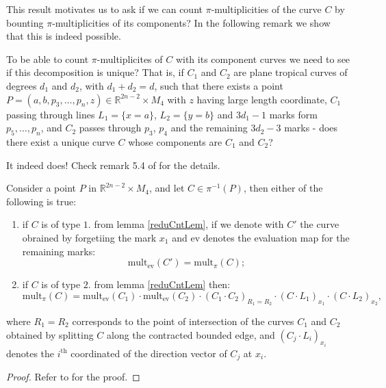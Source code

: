 This result motivates us to ask if we can count $\pi$-multiplicities of the curve $C$ by bounting $\pi$-multiplicities of its components?
In the following remark we show that this is indeed possible.

\begin{remark}
    \label{convReduCnt}
    To be able to count $\pi$-multiplicites of $C$ with its component curves we need to see if this decomposition is unique?
    That is, if $C_{1}$ and $C_{2}$ are plane tropical curves of degrees $d_{1}$ and $d_{2}$, with $d_{1}+d_{2}=d$, such that there exists a point $ P = (a,b, p_{3}, \dots, p_{n}, z) \in \mathbb{R}^{2n-2} \times M_{4}$ 
    with $z$ having large length coordinate, $C_{1}$ passing through lines $L_{1} = \{x = a\}$, $L_{2} = \{y = b\}$ and $3d_{1}-1$  marks form $p_{5},\dots, p_{n}$, and $C_{2}$ passes through $p_{3}$, $p_{4}$ and the remaining $3d_{2}-3$ marks - does there exist a unique curve $C$ whose components are $C_{1}$ and $C_{2}$?
    \par It indeed does! Check remark 5.4 of \cite{GATHMANNwdvv} for the details.
\end{remark}


\begin{proposition}
    \label{multCntProp}
    Consider a point $P$ in $\mathbb{R}^{2n-2}\times M_{4}$, and let $C \in \pi^{-1}(P)$, then either of the following is true:
    \begin{enumerate}
        \item if $C$ is of type $1.$ from lemma \ref{reduCntLem}, if we denote with $C'$ the curve obrained by forgetiing the mark $x_{1}$ and $\text{ev}$ denotes the evaluation map for the remaining marks:
            \[
                \text{mult}_{\text{ev}}(C') = \text{mult}_{\pi}(C);
            \]
        \item if $C$ is of type $2.$ from lemma \ref{reduCntLem} then:
            \[
                \text{mult}_{\pi}(C) = \text{mult}_{\text{ev}}(C_{1}) \cdot \text{mult}_{\text{ev}}(C_{2}) \cdot (C_{1}\cdot C_{2})_{R_{1} = R_{2}} \cdot (C\cdot L_{1})_{x_{1}} \cdot (C\cdot L_{2})_{x_{2}},
            \]
    \end{enumerate}
    where $R_{1}=R_{2}$ corresponds to the point of intersection of the curves $C_{1}$ and $C_{2}$ obtained by splitting $C$ along the contracted bounded edge, and $(C_{j}\cdot L_{i})_{x_{i}}$ denotes the $i^{\text{th}}$ coordinated of the direction vector of $C_{j}$ at $x_{i}$.
\end{proposition}
\begin{proof}
    Refer to \cite{GATHMANNwdvv} for the proof.
\end{proof}

